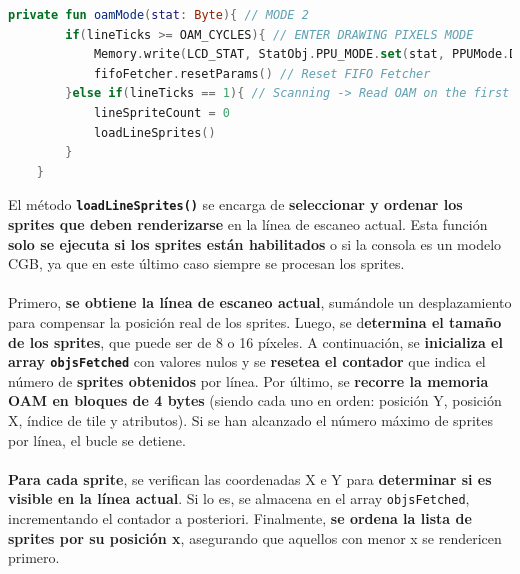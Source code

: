 \begin{lstlisting}[language=Kotlin, caption={Lógica del proceso de OAM Scan.}, label={code:ppuoamscan}]
    private fun oamMode(stat: Byte){ // MODE 2
        if(lineTicks >= OAM_CYCLES){ // ENTER DRAWING PIXELS MODE
            Memory.write(LCD_STAT, StatObj.PPU_MODE.set(stat, PPUMode.DRAW_LCD.number))
            fifoFetcher.resetParams() // Reset FIFO Fetcher
        }else if(lineTicks == 1){ // Scanning -> Read OAM on the first tick
            lineSpriteCount = 0
            loadLineSprites()
        }
    }
\end{lstlisting}

El método \textbf{\texttt{loadLineSprites()}} se encarga de \textbf{seleccionar y ordenar los sprites que deben renderizarse} en la línea de escaneo actual. Esta función \textbf{solo se ejecuta si los sprites están habilitados} o si la consola es un modelo CGB, ya que en este último caso siempre se procesan los sprites.
\\\\
Primero, \textbf{se obtiene la línea de escaneo actual}, sumándole un desplazamiento para compensar la posición real de los sprites. Luego, se d\textbf{etermina el tamaño de los sprites}, que puede ser de 8 o 16 píxeles. A continuación, se \textbf{inicializa el array \texttt{objsFetched}} con valores nulos y se \textbf{resetea el contador} que indica el número de \textbf{sprites obtenidos} por línea. Por último, se \textbf{recorre la memoria OAM en bloques de 4 bytes} (siendo cada uno en orden: posición Y, posición X, índice de tile y atributos). Si se han alcanzado el número máximo de sprites por línea, el bucle se detiene.
\\\\
\textbf{Para cada sprite}, se verifican las coordenadas X e Y para \textbf{determinar si es visible en la línea actual}. Si lo es, se almacena en el array \texttt{objsFetched}, incrementando el contador a posteriori. Finalmente, \textbf{se ordena la lista de sprites por su posición x}, asegurando que aquellos con menor x se rendericen primero.


